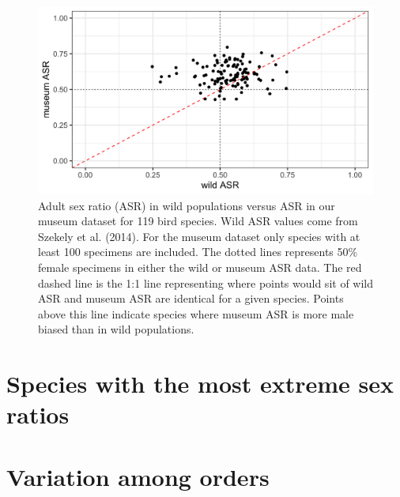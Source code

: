 \documentclass[a4paper, 12pt]{article}
\begin{document}
\begin{figure}[H]
 \centering
  \includegraphics[width = \linewidth]{figures/wild-sex-ratios.png}
  \caption{Adult sex ratio (ASR) in wild populations versus ASR in our museum dataset for 119 bird species. 
  Wild ASR values come from Szekely et al. (2014)\cite{szekely2014sex}. 
  For the museum dataset only species with at least 100 specimens are included. 
  The dotted lines represents 50\% female specimens in either the wild or museum ASR data. 
  The red dashed line is the 1:1 line representing where points would sit of wild ASR and museum ASR are identical for a given species.
  Points above this line indicate species where museum ASR is more male biased than in wild populations.
}
  \label{fig-asr}
\end{figure}

\newpage
\section{Species with the most extreme sex ratios}


\newpage
\section{Variation among orders}
\end{document}
